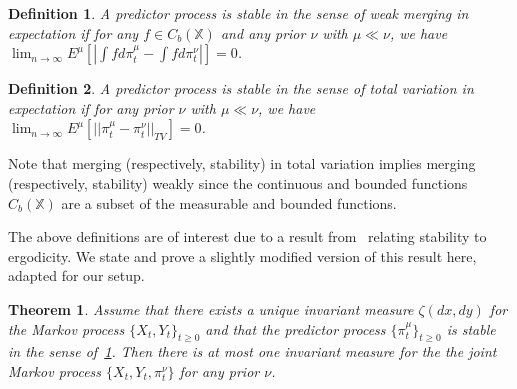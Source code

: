 \documentclass{article}
\newtheorem{theorem}{Theorem}[section]
\newtheorem{definition}{Definition}[section]
\begin{document}
\begin{definition}\label{definition:weak_stable}
    A predictor process is stable in the sense of weak merging in expectation if for any \( f \in C_b(\mathbb{X}) \) and any prior \( \nu \) with \( \mu \ll \nu \), we have \( \lim_{n \to \infty}E^\mu [|\int fd\pi_t^\mu - \int fd\pi_t^\nu|] = 0 \). %
\end{definition}

\begin{definition}\label{definition:TV_stable}
    A predictor process is stable in the sense of total variation in expectation if for any prior \( \nu \) with \( \mu \ll \nu \), we have \( \lim_{n \to \infty}E^\mu [||\pi_t^\mu - \pi_t^\nu||_{TV}] = 0 \). %
\end{definition}

Note that merging (respectively, stability) in total variation implies merging (respectively, stability) weakly since the continuous and bounded functions \( C_b(\mathbb{X}) \) are a subset of the measurable and bounded functions.

The above definitions are of interest due to a result from~\cite[Theorem 2]{Stettner} relating stability to ergodicity. We state and prove a slightly modified version of this result here, adapted for our setup.

\begin{theorem}\label{theorem:unique}
    Assume that there exists a unique invariant measure \( \zeta(dx,dy) \) for the Markov process \( \{X_t,Y_t\}_{t\ge0} \) and that the predictor process \( \{\pi_t^\mu \}_{t\ge0} \) is stable in the sense of~\ref{definition:weak_stable}. Then there is at most one invariant measure for the the joint Markov process \( \{X_t,Y_t,\pi_t^\nu \} \) for any prior \( \nu \). %
\end{theorem}
\end{document}
